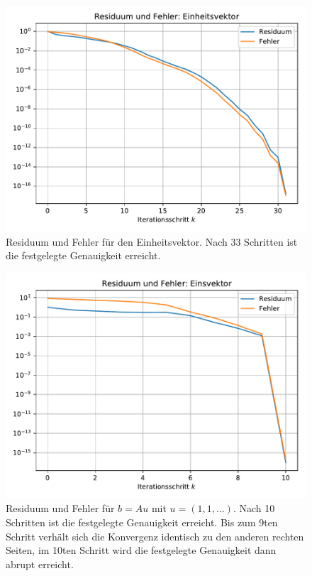 \documentclass[10pt,a4paper]{article}
\begin{document}
\begin{figure}[H]
  \centering
  \includegraphics[width=.85\textwidth]{../figures/residuum_and_errors_einheitsvektor.pdf}
  \caption{
    Residuum und Fehler für den Einheitsvektor.
    Nach \num{33} Schritten ist die festgelegte Genauigkeit erreicht.
  }
  \label{fig:einheit}
\end{figure}

\begin{figure}[H]
  \centering
  \includegraphics[width=.85\textwidth]{../figures/residuum_and_errors_einsvektor.pdf}
  \caption{
    Residuum und Fehler für $b = Au$ mit $u = (1, 1, \dots)$.
    Nach \num{10} Schritten ist die festgelegte Genauigkeit erreicht.
    Bis zum \num{9}ten Schritt verhält sich die Konvergenz identisch zu den
    anderen rechten Seiten, im \num{10}ten Schritt wird die festgelegte
    Genauigkeit dann abrupt erreicht.
  }
  \label{fig:eins}
\end{figure}
\end{document}
